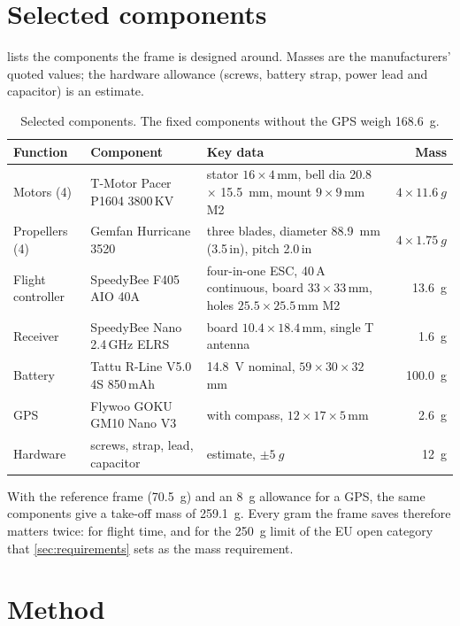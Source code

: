 \section{Selected components}\label{sec:intro-components}

 lists the components the frame is designed around. Masses are the manufacturers' quoted values; the hardware allowance (screws, battery strap, power lead and capacitor) is an estimate.

\begin{table}[htbp]
\centering\small
\caption{Selected components. The fixed components without the GPS weigh \SI{168.6}{g}.}\label{tab:intro-components}
\begin{tabularx}{\linewidth}{@{}llXr@{}}
\toprule
Function & Component & Key data & Mass\\
\midrule
Motors (4) & T-Motor Pacer P1604 3800\,KV & stator $16\times4$\,mm, bell dia 20.8 $\times$ \SI{15.5}{mm}, mount $9\times9$\,mm M2 & $4\times\SI{11.6}{g}$\\
Propellers (4) & Gemfan Hurricane 3520 & three blades, diameter \SI{88.9}{mm} (3.5\,in), pitch 2.0\,in & $4\times\SI{1.75}{g}$\\
Flight controller & SpeedyBee F405 AIO 40A & four-in-one ESC, 40\,A continuous, board $33\times33$\,mm, holes $25.5\times25.5$\,mm M2 & \SI{13.6}{g}\\
Receiver & SpeedyBee Nano 2.4\,GHz ELRS & board $10.4\times18.4$\,mm, single T antenna & \SI{1.6}{g}\\
Battery & Tattu R-Line V5.0 4S 850\,mAh & \SI{14.8}{V} nominal, $59\times30\times32$\,mm & \SI{100.0}{g}\\
GPS & Flywoo GOKU GM10 Nano V3 & with compass, $12\times17\times5$\,mm & \SI{2.6}{g}\\
Hardware & screws, strap, lead, capacitor & estimate, $\pm\SI{5}{g}$ & \SI{12}{g}\\
\bottomrule
\end{tabularx}
\end{table}

With the reference frame (\SI{70.5}{g}) and an \SI{8}{g} allowance for a GPS, the same components give a take-off mass of \SI{259.1}{g}. Every gram the frame saves therefore matters twice: for flight time, and for the \SI{250}{g} limit of the EU open category that \cref{sec:requirements} sets as the mass requirement.

\section{Method}\label{sec:intro-method}


